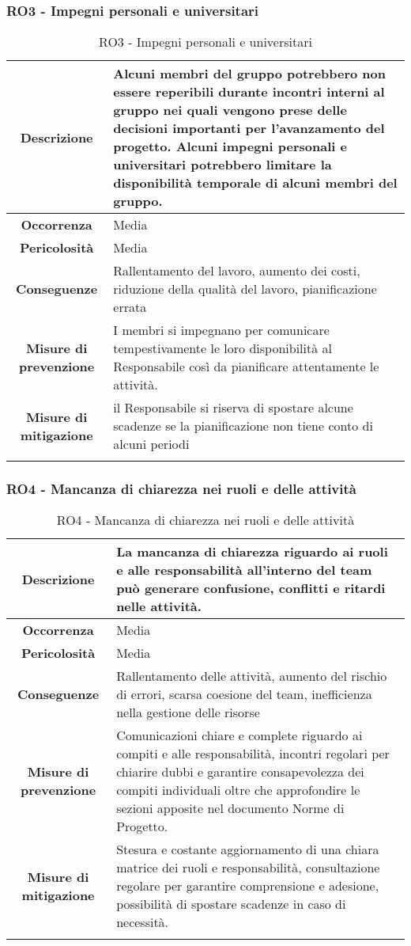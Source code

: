%
%
\subsubsection[RO3]{RO3 - Impegni personali e universitari}\label{ro:3}
\begin{longtable}{|c|p{12cm}|}
\hline
\textbf{Descrizione} & Alcuni membri del gruppo potrebbero non essere reperibili durante incontri interni al gruppo nei quali vengono prese delle decisioni importanti per l'avanzamento del progetto. Alcuni impegni personali e universitari potrebbero limitare la disponibilità temporale di alcuni membri del gruppo. \\
\hline
\textbf{Occorrenza} & Media \\
\hline
\textbf{Pericolosità} & Media \\
\hline
\textbf{Conseguenze} & Rallentamento del lavoro, aumento dei costi, riduzione della qualità del lavoro, pianificazione errata \\
\hline
\textbf{Misure di prevenzione} & I membri si impegnano per comunicare tempestivamente le loro disponibilità al Responsabile così da pianificare attentamente le attività. \\
\hline
\textbf{Misure di mitigazione} &  il Responsabile si riserva di spostare alcune scadenze se la pianificazione non tiene conto di alcuni periodi\\
\hline
\caption{RO3 - Impegni personali e universitari}
\end{longtable}

%
%
\subsubsection[RO4]{RO4 - Mancanza di chiarezza nei ruoli e delle attività}\label{ro:4}
\begin{longtable}{|c|p{12cm}|}
\hline
\textbf{Descrizione} & La mancanza di chiarezza riguardo ai ruoli e alle responsabilità all’interno del team può generare confusione, conflitti e ritardi nelle attività. \\
\hline
\textbf{Occorrenza} & Media \\
\hline
\textbf{Pericolosità} & Media \\
\hline
\textbf{Conseguenze} & Rallentamento delle attività, aumento del rischio di errori, scarsa coesione del team, inefficienza nella gestione delle risorse \\
\hline
\textbf{Misure di prevenzione} & Comunicazioni chiare e complete riguardo ai compiti e alle responsabilità, incontri regolari per chiarire dubbi e garantire consapevolezza dei compiti individuali oltre che approfondire le sezioni apposite nel documento Norme di Progetto. \\
\hline
\textbf{Misure di mitigazione} & Stesura e costante aggiornamento di una chiara matrice dei ruoli e responsabilità, consultazione regolare per garantire comprensione e adesione, possibilità di spostare scadenze in caso di necessità. \\
\hline
\caption{RO4 - Mancanza di chiarezza nei ruoli e delle attività}
\end{longtable}

